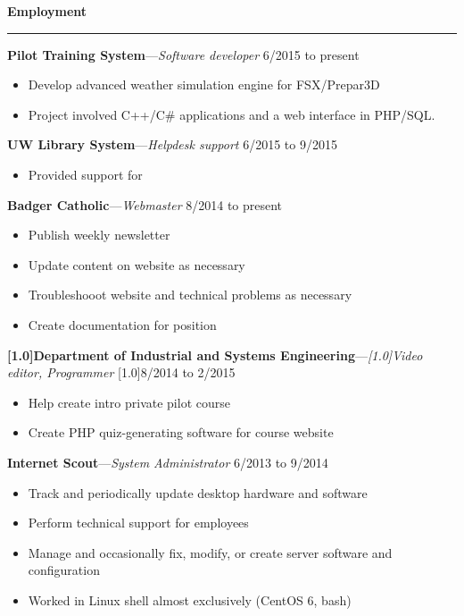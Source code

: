 \documentclass[12pt,letterpaper]{article}
\newenvironment{details}{
    \vspace{-.5em}
    \begin{itemize}
        \renewcommand \labelitemi{\labelitemiv}
        \setlength{\itemsep}{0pt}
        \setlength{\parskip}{-1pt}
        \setlength{\parsep}{0pt}
    }{
    \end{itemize}
    \vspace{-.5em}
}
\newcommand{\hr} {
    \vspace{-1em}
    \par\rule{\textwidth}{1pt}
    \vspace{-1.5em}
}
\newcommand{\ressection}[1] {
    \par{\large \textbf{#1}}
    \hr
}
\newenvironment{employment} {
    \setlength{\parskip}{0pt}
    \ressection{Employment}
}{
    \vspace{0.5em}
}
\newcommand{\employer}[3] {
    \vspace{3pt}
    {\par\textbf{#1}---\textit{#2} \hfill #3}
}
\begin{document}
\begin{employment} 

\employer{Pilot Training System}{Software developer}{6/2015 to present}
\begin{details}
    \item Develop advanced weather simulation engine for FSX/Prepar3D
    \item Project involved C++/C\# applications and a web interface in PHP/SQL.
\end{details}

\employer{UW Library System}{Helpdesk support}{6/2015 to 9/2015}
\begin{details}
    \item Provided support for 
\end{details}

\employer{Badger Catholic}{Webmaster}{8/2014 to present}
\begin{details}
    \item Publish weekly newsletter
    \item Update content on website as necessary
    \item Troubleshooot website and technical problems as necessary
    \item Create documentation for position
\end{details}

\employer{\scalebox{.8}[1.0]{Department of Industrial and Systems Engineering}}{\scalebox{.9}[1.0]{Video editor, Programmer}}{\scalebox{.9}[1.0]{8/2014 to 2/2015}}
\begin{details}
    \item Help create intro private pilot course
    \item Create PHP quiz-generating software for course website
\end{details}

\employer{Internet Scout}{System Administrator}{6/2013 to 9/2014}
\begin{details}
    \item Track and periodically update desktop hardware and software
    \item Perform technical support for employees
    \item Manage and occasionally fix, modify, or create server software and configuration
    \item Worked in Linux shell almost exclusively (CentOS 6, bash)
\end{details}

\end{employment}
\end{document}
